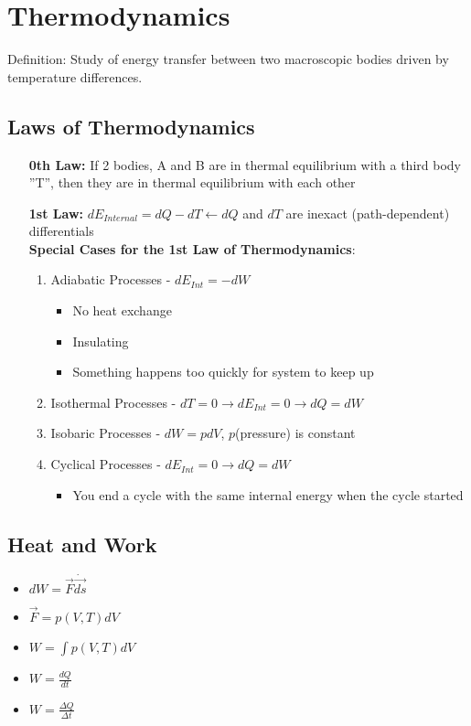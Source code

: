 \documentclass[10pt,letterpaper,final,twoside,notitlepage]{article}
\numberwithin{equation}{section} %
\begin{document}
\section{Thermodynamics} \label{sec:Thermo}
Definition: Study of energy transfer between two macroscopic bodies driven by temperature differences.

	\subsection*{Laws of Thermodynamics} \label{subsec:Thermo Laws}
		\begin{enumerate}
			\item[\textbf{0th Law:}] If 2 bodies, A and B are in thermal equilibrium with a third body ''T'', then they are in thermal equilibrium with each other
			\item[\textbf{1st Law:}] $dE_{Internal} = dQ - dT \leftarrow dQ$ and $dT$ are inexact (path-dependent) differentials \\
			\textbf{Special Cases for the 1st Law of Thermodynamics}:
			\begin{enumerate}
				\item Adiabatic Processes - $dE_{Int} = -dW$
				\begin{itemize}[noitemsep, nolistsep]
					\item No heat exchange
					\item Insulating
					\item Something happens too quickly for system to keep up
				\end{itemize}
				\item Isothermal Processes - $dT = 0 \rightarrow dE_{Int} = 0 \rightarrow dQ = dW$
				\item Isobaric Processes - $dW = pdV$, $p$(pressure) is constant
				\item Cyclical Processes - $dE_{Int} = 0 \rightarrow dQ = dW$
				\begin{itemize}[noitemsep, nolistsep]
					\item You end a cycle with the same internal energy when the cycle started
				\end{itemize}
			\end{enumerate}
		\end{enumerate}
	
	\subsection*{Heat and Work} \label{subsec:Heat/Work}
	\begin{itemize}[noitemsep, nolistsep]
		\item $dW = \vec{F} \dot \vec{ds}$
		\item $\vec{F} = p \left( V, T \right) dV$
		\item $W = \int p \left( V, T \right) dV$
		\item $W = \frac{dQ}{dt}$
		\item $W = \frac{\Delta Q}{\Delta t}$
	\end{itemize}
\end{document}
